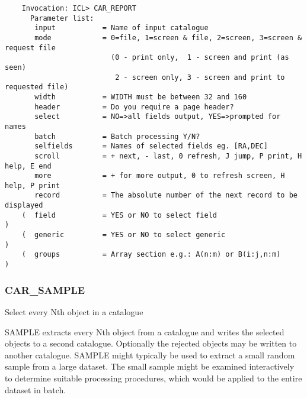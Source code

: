 \begin{verbatim}
    Invocation: ICL> CAR_REPORT
      Parameter list:
       input           = Name of input catalogue
       mode            = 0=file, 1=screen & file, 2=screen, 3=screen & request file
                         (0 - print only,  1 - screen and print (as seen)
                          2 - screen only, 3 - screen and print to requested file)
       width           = WIDTH must be between 32 and 160
       header          = Do you require a page header?
       select          = NO=>all fields output, YES=>prompted for names
       batch           = Batch processing Y/N?
       selfields       = Names of selected fields eg. [RA,DEC]
       scroll          = + next, - last, 0 refresh, J jump, P print, H help, E end 
       more            = + for more output, 0 to refresh screen, H help, P print
       record          = The absolute number of the next record to be displayed
    (  field           = YES or NO to select field                               )
    (  generic         = YES or NO to select generic                             )
    (  groups          = Array section e.g.: A(n:m) or B(i:j,n:m)                )
\end{verbatim}

\subsubsection{CAR\_SAMPLE}

Select every Nth object in a catalogue

SAMPLE extracts every Nth object from a catalogue and writes the selected 
objects to a second catalogue. 
Optionally the rejected objects may be written to another catalogue. 
SAMPLE might typically be used to extract a small random sample from a large
dataset. 
The small sample might be examined interactively to determine suitable 
processing procedures, which would be applied to the entire dataset in batch. 

